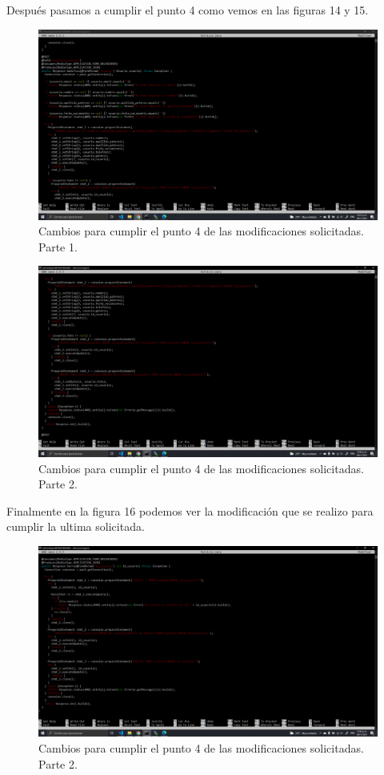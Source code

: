 \documentclass[11pt]{article}
\begin{document}
		Después pasamos a cumplir el punto 4 como vemos en las figuras 14 y 15.
		\begin{figure}[H]
			\centering
			\includegraphics[scale=0.34]{resources/p4.png}
			\caption{Cambios para cumplir el punto 4 de las modificaciones solicitadas. Parte 1.}\label{fig:picture}
		\end{figure}
		\begin{figure}[H]
			\centering
			\includegraphics[scale=0.34]{resources/p4.1.png}
			\caption{Cambios para cumplir el punto 4 de las modificaciones solicitadas. Parte 2.}\label{fig:picture}
		\end{figure}
		Finalmente en la figura 16 podemos ver la modificación que se realizo para cumplir la ultima  solicitada.
		\begin{figure}[H]
			\centering
			\includegraphics[scale=0.34]{resources/p5.png}
			\caption{Cambios para cumplir el punto 4 de las modificaciones solicitadas. Parte 2.}\label{fig:picture}
		\end{figure}
\end{document}
